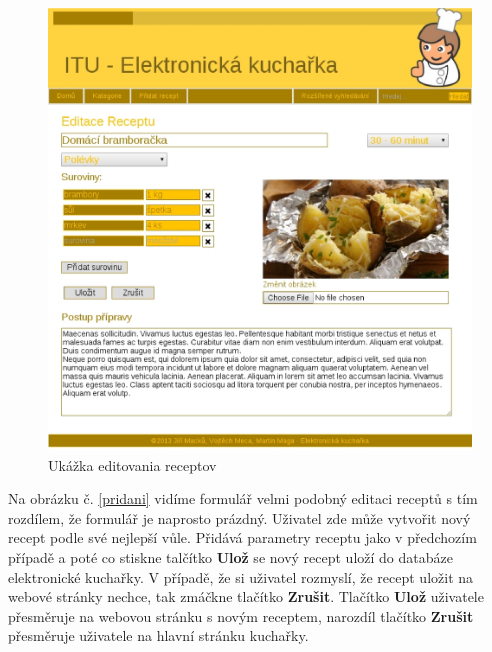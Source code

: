 \documentclass[12pt,a4paper,titlepage,final]{article}
\begin{document}
\begin{figure}

\begin{center}

\includegraphics[scale=0.6]{img/edit.eps} 
\caption{Ukážka editovania receptov}
\label{edit}

\end{center}

\end{figure}
\newpage
Na obrázku č. \ref{pridani} vidíme formulář velmi podobný editaci receptů s tím rozdílem, že formulář je naprosto prázdný. Uživatel zde může vytvořit nový recept podle své nejlepší vůle. Přidává parametry receptu jako v předchozím případě a poté co stiskne talčítko \textbf{Ulož} se nový recept uloží do databáze elektronické kuchařky. V případě, že si uživatel rozmyslí, že recept uložit na webové stránky nechce, tak zmáčkne tlačítko \textbf{Zrušit}. Tlačítko \textbf{Ulož} uživatele přesměruje na webovou stránku s novým receptem, narozdíl tlačítko \textbf{Zrušit} přesměruje uživatele na hlavní stránku kuchařky.\newline
\end{document}
